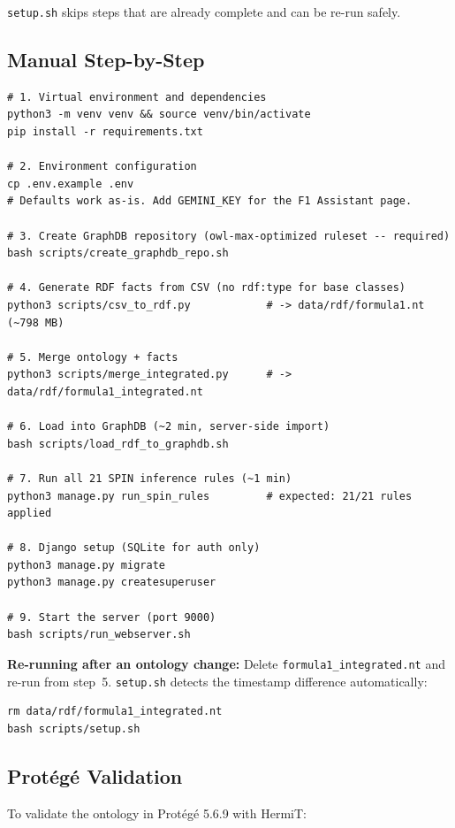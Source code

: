\documentclass[12pt,a4paper]{article}
\begin{document}
\texttt{setup.sh} skips steps that are already complete and can be re-run safely.

\subsection{Manual Step-by-Step}

\begin{lstlisting}[style=shell, caption={Complete setup from a fresh clone}]
# 1. Virtual environment and dependencies
python3 -m venv venv && source venv/bin/activate
pip install -r requirements.txt

# 2. Environment configuration
cp .env.example .env
# Defaults work as-is. Add GEMINI_KEY for the F1 Assistant page.

# 3. Create GraphDB repository (owl-max-optimized ruleset -- required)
bash scripts/create_graphdb_repo.sh

# 4. Generate RDF facts from CSV (no rdf:type for base classes)
python3 scripts/csv_to_rdf.py            # -> data/rdf/formula1.nt (~798 MB)

# 5. Merge ontology + facts
python3 scripts/merge_integrated.py      # -> data/rdf/formula1_integrated.nt

# 6. Load into GraphDB (~2 min, server-side import)
bash scripts/load_rdf_to_graphdb.sh

# 7. Run all 21 SPIN inference rules (~1 min)
python3 manage.py run_spin_rules         # expected: 21/21 rules applied

# 8. Django setup (SQLite for auth only)
python3 manage.py migrate
python3 manage.py createsuperuser

# 9. Start the server (port 9000)
bash scripts/run_webserver.sh
\end{lstlisting}

\textbf{Re-running after an ontology change:}
Delete \texttt{formula1\_integrated.nt} and re-run from step~5.
\texttt{setup.sh} detects the timestamp difference automatically:

\begin{lstlisting}[style=shell]
rm data/rdf/formula1_integrated.nt
bash scripts/setup.sh
\end{lstlisting}

\subsection{Protégé Validation}

To validate the ontology in Protégé 5.6.9 with HermiT:
\end{document}

